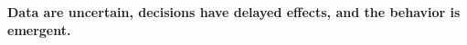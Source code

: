 \bigskip

\textbf{Data are uncertain, decisions have delayed effects, and the behavior is emergent.}















